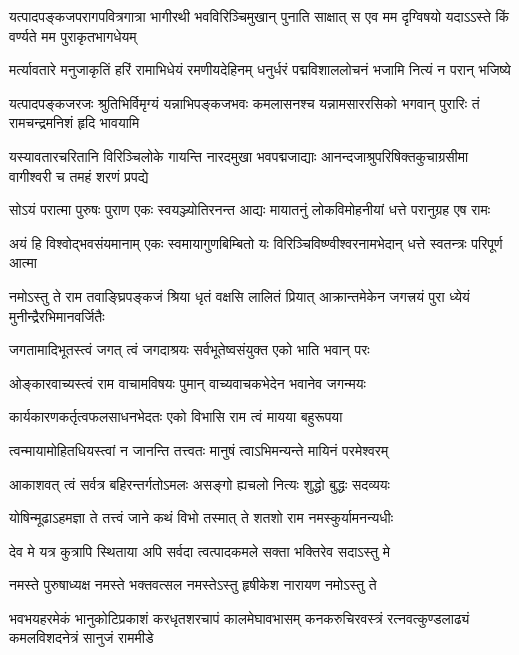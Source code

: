 \fourlineindentedshloka
{यत्पादपङ्कजपरागपवित्रगात्रा}
{भागीरथी भवविरिञ्चिमुखान् पुनाति}
{साक्षात् स एव मम दृग्विषयो यदाऽऽस्ते}
{किं वर्ण्यते मम पुराकृतभागधेयम्} %

\fourlineindentedshloka
{मर्त्यावतारे मनुजाकृतिं हरिं}
{रामाभिधेयं रमणीयदेहिनम्}
{धनुर्धरं पद्मविशाललोचनं}
{भजामि नित्यं न परान् भजिष्ये} %

\fourlineindentedshloka
{यत्पादपङ्कजरजः श्रुतिभिर्विमृग्यं}
{यन्नाभिपङ्कजभवः कमलासनश्च}
{यन्नामसाररसिको भगवान् पुरारिः}
{तं रामचन्द्रमनिशं हृदि भावयामि} %

\fourlineindentedshloka
{यस्यावतारचरितानि विरिञ्चिलोके}
{गायन्ति नारदमुखा भवपद्मजाद्याः}
{आनन्दजाश्रुपरिषिक्तकुचाग्रसीमा}
{वागीश्वरी च तमहं शरणं प्रपद्ये} %

\fourlineindentedshloka
{सोऽयं परात्मा पुरुषः पुराण}
{एकः स्वयञ्ज्योतिरनन्त आद्यः}
{मायातनुं लोकविमोहनीयां}
{धत्ते परानुग्रह एष रामः} %

\fourlineindentedshloka
{अयं हि विश्वोद्भवसंयमानाम्}
{एकः स्वमायागुणबिम्बितो यः}
{विरिञ्चिविष्ण्वीश्वरनामभेदान्}
{धत्ते स्वतन्त्रः परिपूर्ण आत्मा} %

\fourlineindentedshloka
{नमोऽस्तु ते राम तवाङ्घ्रिपङ्कजं}
{श्रिया धृतं वक्षसि लालितं प्रियात्}
{आक्रान्तमेकेन जगत्त्रयं पुरा}
{ध्येयं मुनीन्द्रैरभिमानवर्जितैः} %

\twolineshloka
{जगतामादिभूतस्त्वं जगत् त्वं जगदाश्रयः}
{सर्वभूतेष्वसंयुक्त एको भाति भवान् परः} %

\twolineshloka
{ओङ्कारवाच्यस्त्वं राम वाचामविषयः पुमान्}
{वाच्यवाचकभेदेन भवानेव जगन्मयः} %

\twolineshloka
{कार्यकारणकर्तृत्वफलसाधनभेदतः}
{एको विभासि राम त्वं मायया बहुरूपया} %

\twolineshloka
{त्वन्मायामोहितधियस्त्वां न जानन्ति तत्त्वतः}
{मानुषं त्वाऽभिमन्यन्ते मायिनं परमेश्वरम्} %

\twolineshloka
{आकाशवत् त्वं सर्वत्र बहिरन्तर्गतोऽमलः}
{असङ्गो ह्यचलो नित्यः शुद्धो बुद्धः सदव्ययः} %

\twolineshloka
{योषिन्मूढाऽहमज्ञा ते तत्त्वं जाने कथं विभो}
{तस्मात् ते शतशो राम नमस्कुर्यामनन्यधीः} %

\twolineshloka
{देव मे यत्र कुत्रापि स्थिताया अपि सर्वदा}
{त्वत्पादकमले सक्ता भक्तिरेव सदाऽस्तु मे} %

\twolineshloka
{नमस्ते पुरुषाध्यक्ष नमस्ते भक्तवत्सल}
{नमस्तेऽस्तु हृषीकेश नारायण नमोऽस्तु ते} %

\fourlineindentedshloka
{भवभयहरमेकं भानुकोटिप्रकाशं}
{करधृतशरचापं कालमेघावभासम्}
{कनकरुचिरवस्त्रं रत्नवत्कुण्डलाढ्यं}
{कमलविशदनेत्रं सानुजं राममीडे} %


